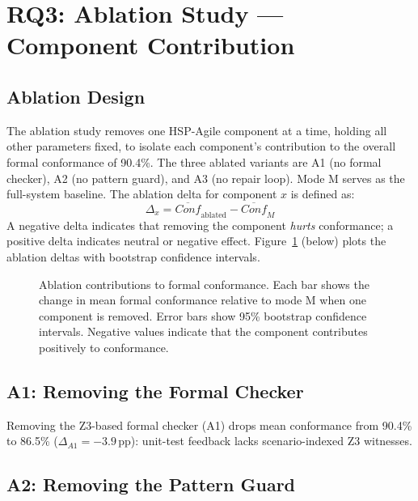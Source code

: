 \section{RQ3: Ablation Study --- Component Contribution}
\label{sec:exp:rq3}

\subsection{Ablation Design}

The ablation study removes one HSP-Agile component at a time, holding all other
parameters fixed, to isolate each component's contribution to the overall formal
conformance of 90.4\%.  The three ablated variants are A1 (no formal checker), A2
(no pattern guard), and A3 (no repair loop).  Mode M serves as the full-system
baseline.  The ablation delta for component $x$ is defined as:
\[
  \Delta_x = \overline{\mathit{Conf}}_{\text{ablated}} - \overline{\mathit{Conf}}_M
\]
A negative delta indicates that removing the component \emph{hurts} conformance;
a positive delta indicates neutral or negative effect.
Figure~\ref{fig:ablation-ci} (below) plots the ablation deltas with bootstrap
confidence intervals.

\begin{figure}[t]
  \centering
  \caption{Ablation contributions to formal conformance.  Each bar shows the change
    in mean formal conformance relative to mode M when one component is removed.
    Error bars show 95\% bootstrap confidence intervals.  Negative values indicate
    that the component contributes positively to conformance.}
  \label{fig:ablation-ci}
\end{figure}

\subsection{A1: Removing the Formal Checker}

Removing the Z3-based formal checker (A1) drops mean conformance from 90.4\% to
86.5\% ($\Delta_{A1} = -3.9$\,pp): unit-test feedback lacks scenario-indexed
Z3 witnesses.

\subsection{A2: Removing the Pattern Guard}


